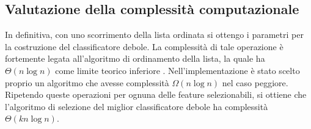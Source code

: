         \subsection{Valutazione della complessità computazionale}
            In definitiva, con uno scorrimento della lista ordinata si ottengo i parametri per la costruzione del classificatore debole. La complessità di tale operazione è fortemente legata all'algoritmo di ordinamento della lista, la quale ha $\Theta(n\log n)$ come limite teorico inferiore \cite[p. 167]{Cormen09}. Nell'implementazione è stato scelto proprio un algoritmo che avesse complessità $\Omega(n\log n)$ nel caso peggiore. Ripetendo queste operazioni per ognuna delle feature selezionabili, si ottiene che l'algoritmo di selezione del miglior classificatore debole ha complessità $\Theta(kn\log n)$.
